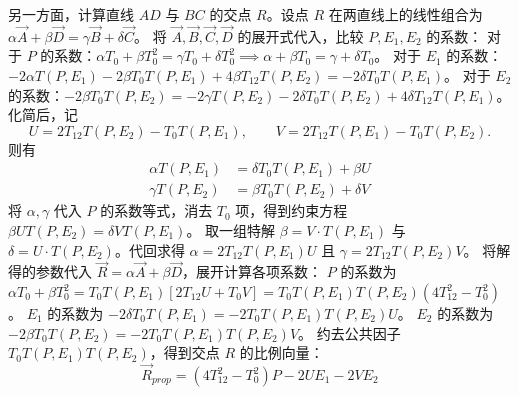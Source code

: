 \begin{solution}
另一方面，计算直线 $AD$ 与 $BC$ 的交点 $R$。设点 $R$ 在两直线上的线性组合为 $\alpha \vec{A} + \beta \vec{D} = \gamma \vec{B} + \delta \vec{C}$。
将 $\vec{A}, \vec{B}, \vec{C}, \vec{D}$ 的展开式代入，比较 $P, E_1, E_2$ 的系数：
对于 $P$ 的系数：$\alpha T_0 + \beta T_0^2 = \gamma T_0 + \delta T_0^2 \implies \alpha + \beta T_0 = \gamma + \delta T_0$。
对于 $E_1$ 的系数：$-2\alpha T(P,E_1) - 2\beta T_0 T(P,E_1) + 4\beta T_{12} T(P,E_2) = -2\delta T_0 T(P,E_1)$。
对于 $E_2$ 的系数：$-2\beta T_0 T(P,E_2) = -2\gamma T(P,E_2) - 2\delta T_0 T(P,E_2) + 4\delta T_{12} T(P,E_1)$。
化简后，记
$$ U = 2T_{12} T(P,E_2) - T_0 T(P,E_1), \qquad V = 2T_{12} T(P,E_1) - T_0 T(P,E_2). $$
\noindent 则有
\begin{align*}
\alpha T(P,E_1) &= \delta T_0 T(P,E_1) + \beta U \\
\gamma T(P,E_2) &= \beta T_0 T(P,E_2) + \delta V
\end{align*}
将 $\alpha, \gamma$ 代入 $P$ 的系数等式，消去 $T_0$ 项，得到约束方程 $\beta U T(P,E_2) = \delta V T(P,E_1)$。
取一组特解 $\beta = V \cdot T(P,E_1)$ 与 $\delta = U \cdot T(P,E_2)$。代回求得 $\alpha = 2T_{12} T(P,E_1) U$ 且 $\gamma = 2T_{12} T(P,E_2) V$。
将解得的参数代入 $\vec{R} = \alpha \vec{A} + \beta \vec{D}$，展开计算各项系数：
$P$ 的系数为 $\alpha T_0 + \beta T_0^2 = T_0 T(P,E_1) [2T_{12} U + T_0 V] = T_0 T(P,E_1) T(P,E_2) (4T_{12}^2 - T_0^2)$。
$E_1$ 的系数为 $-2\delta T_0 T(P,E_1) = -2 T_0 T(P,E_1) T(P,E_2) U$。
$E_2$ 的系数为 $-2\beta T_0 T(P,E_2) = -2 T_0 T(P,E_1) T(P,E_2) V$。
约去公共因子 $T_0 T(P,E_1) T(P,E_2)$，得到交点 $R$ 的比例向量：
$$ \vec{R}_{prop} = (4T_{12}^2 - T_0^2) P - 2U E_1 - 2V E_2 $$


\end{solution}
